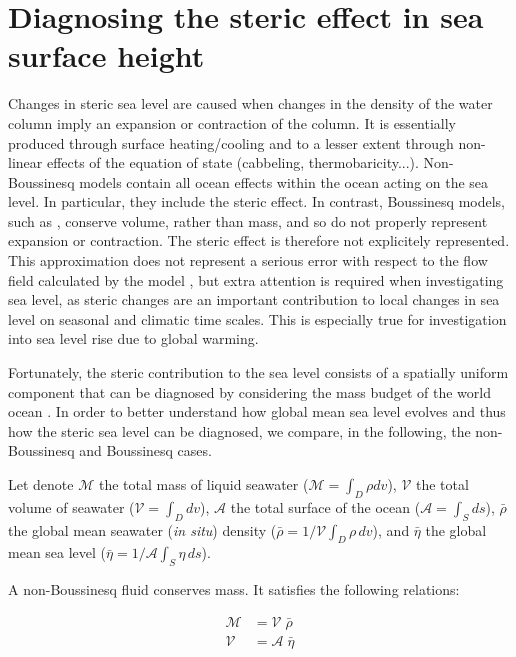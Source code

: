 \documentclass[../main/NEMO_manual]{subfiles}
\begin{document}
\section{Diagnosing the steric effect in sea surface height}
\label{sec:DIA_steric}

Changes in steric sea level are caused when changes in the density of the water column imply an expansion or
contraction of the column.
It is essentially produced through surface heating/cooling and to a lesser extent through non-linear effects of
the equation of state (cabbeling, thermobaricity...).
Non-Boussinesq models contain all ocean effects within the ocean acting on the sea level.
In particular, they include the steric effect.
In contrast, Boussinesq models, such as \NEMO, conserve volume, rather than mass,
and so do not properly represent expansion or contraction.
The steric effect is therefore not explicitely represented.
This approximation does not represent a serious error with respect to the flow field calculated by the model
\citep{greatbatch_JGR94}, but extra attention is required when investigating sea level,
as steric changes are an important contribution to local changes in sea level on seasonal and climatic time scales.
This is especially true for investigation into sea level rise due to global warming.

Fortunately, the steric contribution to the sea level consists of a spatially uniform component that
can be diagnosed by considering the mass budget of the world ocean \citep{greatbatch_JGR94}.
In order to better understand how global mean sea level evolves and thus how the steric sea level can be diagnosed,
we compare, in the following, the non-Boussinesq and Boussinesq cases.

Let denote
$\mathcal{M}$ the total mass    of liquid seawater ($\mathcal{M} = \int_D \rho dv$),
$\mathcal{V}$ the total volume  of        seawater      ($\mathcal{V} = \int_D dv$),
$\mathcal{A}$ the total surface of       the ocean      ($\mathcal{A} = \int_S ds$),
$\bar{\rho}$ the global mean  seawater (\textit{in situ}) density
($\bar{\rho} = 1/\mathcal{V} \int_D \rho \,dv$), and
$\bar{\eta}$ the global mean sea level
($\bar{\eta} = 1/\mathcal{A} \int_S \eta \,ds$).

A non-Boussinesq fluid conserves mass. It satisfies the following relations:

\begin{equation}
  \begin{split}
    \mathcal{M} &=  \mathcal{V}  \;\bar{\rho} \\
    \mathcal{V} &=  \mathcal{A}  \;\bar{\eta}
  \end{split}
  \label{eq:DIA_MV_nBq}
\end{equation}
\end{document}

